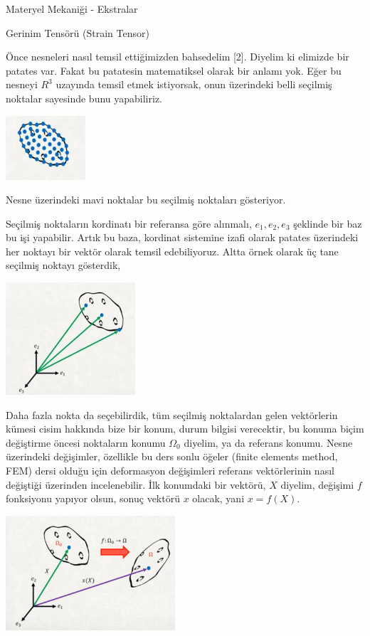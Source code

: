 \documentclass[12pt,fleqn]{article}\usepackage{../../common}
\begin{document}
Materyel Mekaniği - Ekstralar

Gerinim Tensörü (Strain Tensor) 

Önce nesneleri nasıl temsil ettiğimizden bahsedelim [2]. Diyelim ki elimizde bir
patates var. Fakat bu patatesin matematiksel olarak bir anlamı yok. Eğer bu
nesneyi $R^3$ uzayında temsil etmek istiyorsak, onun üzerindeki belli seçilmiş
noktalar sayesinde bunu yapabiliriz.

\includegraphics[width=8em]{phy_020_strs_01_01.jpg}

Nesne üzerindeki mavi noktalar bu seçilmiş noktaları gösteriyor.

Seçilmiş noktaların kordinatı bir referansa göre alınmalı, $e_1,e_2,e_3$
şeklinde bir baz bu işi yapabilir. Artık bu baza, kordinat sistemine izafi
olarak patates üzerindeki her noktayı bir vektör olarak temsil edebiliyoruz.
Altta örnek olarak üç tane seçilmiş noktayı gösterdik,

\includegraphics[width=13em]{phy_020_strs_01_02.jpg}

Daha fazla nokta da seçebilirdik, tüm seçilmiş noktalardan gelen vektörlerin
kümesi cisim hakkında bize bir konum, durum bilgisi verecektir, bu konuma biçim
değiştirme öncesi noktaların konumu $\Omega_0$ diyelim, ya da referans konumu.
Nesne üzerindeki değişimler, özellikle bu ders sonlu öğeler (finite elements
method, FEM) dersi olduğu için deformasyon değişimleri referans vektörlerinin
nasıl değiştiği üzerinden incelenebilir. İlk konumdaki bir vektörü, $X$ diyelim,
değişimi $f$ fonksiyonu yapıyor olsun, sonuç vektörü $x$ olacak, yani $x =
f(X)$.

\includegraphics[width=17em]{phy_020_strs_01_03.jpg}
\end{document}
